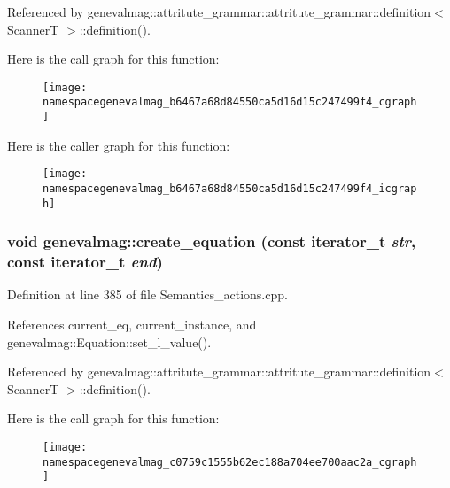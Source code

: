 Referenced by genevalmag::attritute\_\-grammar::attritute\_\-grammar::definition$<$ ScannerT $>$::definition().

Here is the call graph for this function:\nopagebreak
\begin{figure}[H]
\begin{center}
\leavevmode
\texttt{[image: namespacegenevalmag\_b6467a68d84550ca5d16d15c247499f4\_cgraph]}
\end{center}
\end{figure}


Here is the caller graph for this function:\nopagebreak
\begin{figure}[H]
\begin{center}
\leavevmode
\texttt{[image: namespacegenevalmag\_b6467a68d84550ca5d16d15c247499f4\_icgraph]}
\end{center}
\end{figure}
\hypertarget{namespacegenevalmag_c0759c1555b62ec188a704ee700aac2a}{
\subsubsection[{create\_\-equation}]{\setlength{\rightskip}{0pt plus 5cm}void genevalmag::create\_\-equation (const iterator\_\-t {\em str}, \/  const iterator\_\-t {\em end})}}
\label{namespacegenevalmag_c0759c1555b62ec188a704ee700aac2a}




Definition at line 385 of file Semantics\_\-actions.cpp.

References current\_\-eq, current\_\-instance, and genevalmag::Equation::set\_\-l\_\-value().

Referenced by genevalmag::attritute\_\-grammar::attritute\_\-grammar::definition$<$ ScannerT $>$::definition().

Here is the call graph for this function:\nopagebreak
\begin{figure}[H]
\begin{center}
\leavevmode
\texttt{[image: namespacegenevalmag\_c0759c1555b62ec188a704ee700aac2a\_cgraph]}
\end{center}
\end{figure}


